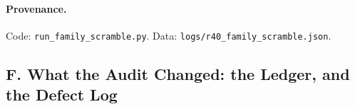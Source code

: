 \paragraph{Provenance.} Code: \texttt{run\_family\_scramble.py}. Data: \texttt{logs/r40\_family\_scramble.json}.

\subsection*{F. What the Audit Changed: the Ledger, and the Defect Log}

